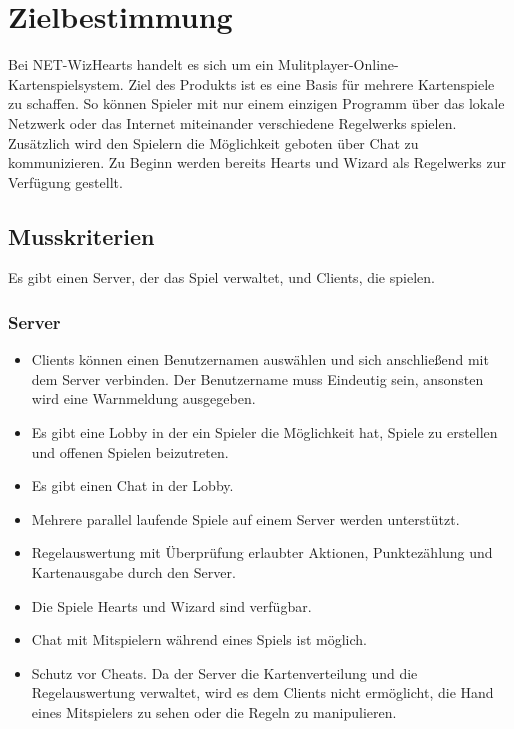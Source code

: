 \documentclass{article}
\begin{document}
\tableofcontents
\newpage

\section{Zielbestimmung}
Bei NET-WizHearts handelt es sich um ein Mulitplayer-Online-Kartenspielsystem. Ziel des Produkts ist es eine Basis für mehrere Kartenspiele zu schaffen. So können Spieler mit nur einem einzigen Programm über das lokale Netzwerk oder das Internet miteinander verschiedene \glspl{Regelwerk} spielen. Zusätzlich wird den Spielern die Möglichkeit geboten über Chat zu kommunizieren. Zu Beginn werden bereits Hearts und Wizard als \glspl{Regelwerk} zur Verfügung gestellt.

\subsection{Musskriterien}
Es gibt einen \gls{Server}, der das Spiel verwaltet, und \glspl{Client}, die spielen.
\subsubsection{\gls{Server}}
\begin{itemize}
	\item \glspl{Client} können einen Benutzernamen auswählen und sich anschließend mit dem \gls{Server} verbinden.
		Der Benutzername muss Eindeutig sein, ansonsten wird eine Warnmeldung ausgegeben.
	\item Es gibt eine \gls{Lobby} in der ein Spieler die Möglichkeit hat, Spiele zu erstellen und offenen Spielen beizutreten.
	\item Es gibt einen Chat in der \gls{Lobby}.
	\item Mehrere parallel laufende Spiele auf einem \gls{Server} werden unterstützt.
	\item Regelauswertung mit Überprüfung erlaubter Aktionen, Punktezählung und  Kartenausgabe durch den \gls{Server}.
	\item Die Spiele Hearts und Wizard sind verfügbar.	
	\item Chat mit Mitspielern während eines Spiels ist möglich.
	\item Schutz vor Cheats. Da der \gls{Server} die Kartenverteilung und die Regelauswertung verwaltet, wird es dem 					\glspl{Client} nicht ermöglicht, die Hand eines Mitspielers zu sehen oder die Regeln zu manipulieren.
\end{itemize}
\end{document}
